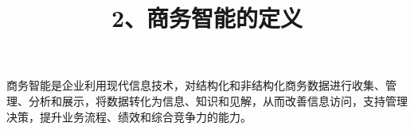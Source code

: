 \documentclass[UTF8,zihao=-4]{ctexart}
\begin{document}
\title{2、商务智能的定义}
\author{}
\date{}
\maketitle

商务智能是企业利用现代信息技术，对结构化和非结构化商务数据进行收集、管理、分析和展示，将数据转化为信息、知识和见解，从而改善信息访问，支持管理决策，提升业务流程、绩效和综合竞争力的能力。\par
\end{document}
